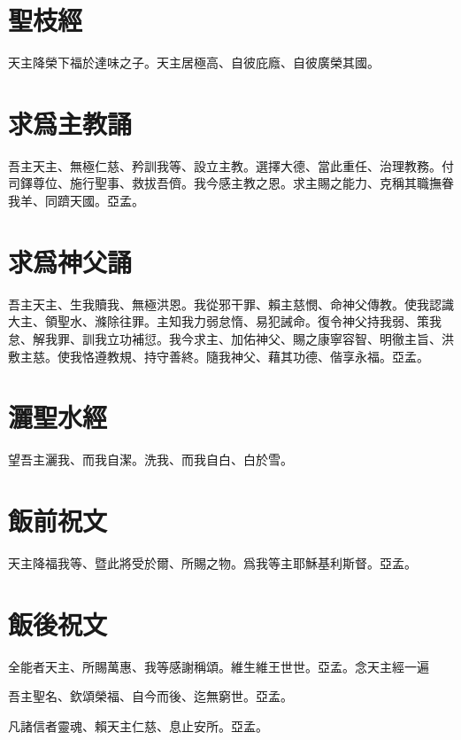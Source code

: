 \section*{聖枝經}
天主降榮下福於達味之子。天主居極高、自彼庇廕、自彼廣榮其國。

\section*{求爲主教誦}
吾主天主、無極仁慈、矜訓我等、設立主教。選擇大德、當此重任、治理教務。付司鐸尊位、施行聖事、救拔吾儕。我今感主教之恩。求主賜之能力、克稱其職撫眷我羊、同躋天國。{\cspace}亞孟。

\section*{求爲神父誦}
吾主天主、生我贖我、無極洪恩。我從邪干罪、賴主慈憫、命神父傳教。使我認識大主、領聖水、滌除往罪。主知我力弱怠惰、易犯誡命。復令神父持我弱、策我怠、解我罪、訓我立功補愆。我今求主、加佑神父、賜之康寧容智、明徹主旨、洪敷主慈。使我恪遵教規、持守善終。隨我神父、藉其功德、偕享永福。{\cspace}亞孟。

\section*{灑聖水經}
望吾主灑我、而我自潔。洗我、而我自白、白於雪。

\section*{飯前祝文}
天主降福我等、暨此將受於爾、所賜之物。爲我等主耶穌基利斯督。{\cspace}亞孟。

\section*{飯後祝文}
全能者天主、所賜萬惠、我等感謝稱頌。維生維王世世。{\cspace}亞孟。{\small 念天主經一遍}

吾主聖名、欽頌榮福、自今而後、迄無窮世。{\cspace}亞孟。

凡諸信者靈魂、賴天主仁慈、息止安所。{\cspace}亞孟。